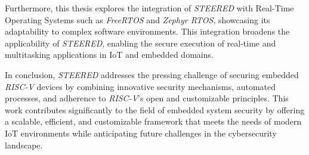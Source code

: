 Furthermore, this thesis explores the integration of \textit{STEERED} with Real-Time
Operating Systems such as \textit{FreeRTOS} and \textit{Zephyr RTOS}, showcasing
its adaptability to complex software environments. This integration broadens the
applicability of \textit{STEERED}, enabling the secure execution of real-time
and multitasking applications in IoT and embedded domains.

In conclusion, \textit{STEERED} addresses the pressing challenge of securing
embedded \textit{RISC-V} devices by combining innovative security mechanisms,
automated processes, and adherence to \textit{RISC-V}'s open and customizable
principles. This work contributes significantly to the field of embedded system security
by offering a scalable, efficient, and customizable framework that meets the needs
of modern IoT environments while anticipating future challenges in the cybersecurity
landscape.